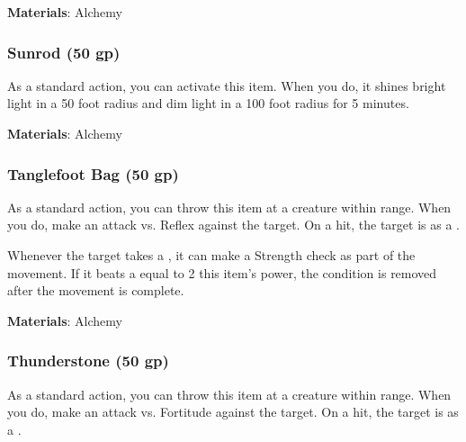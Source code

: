 \vspace{0.25em}
\textbf{Materials}: Alchemy


\lowercase{\hypertarget{item:Sunrod}{}}\label{item:Sunrod}
\hypertarget{item:Sunrod}{\subsubsection{Sunrod\hfill{} (50 gp)}}

As a standard action, you can activate this item.
When you do, it shines bright light in a 50 foot radius and dim light in a 100 foot radius for 5 minutes.



\vspace{0.25em}
\textbf{Materials}: Alchemy


\lowercase{\hypertarget{item:Tanglefoot Bag}{}}\label{item:Tanglefoot Bag}
\hypertarget{item:Tanglefoot Bag}{\subsubsection{Tanglefoot Bag\hfill{} (50 gp)}}

As a standard action, you can throw this item at a creature within \rngclose range.
When you do, make an attack vs. Reflex against the target.
On a hit, the target is  as a .

Whenever the target takes a , it can make a Strength check as part of the movement.
If it beats a  equal to 2 \add this item's power, the condition is removed after the movement is complete.



\vspace{0.25em}
\textbf{Materials}: Alchemy


\lowercase{\hypertarget{item:Thunderstone}{}}\label{item:Thunderstone}
\hypertarget{item:Thunderstone}{\subsubsection{Thunderstone\hfill{} (50 gp)}}

As a standard action, you can throw this item at a creature within \rngclose range.
When you do, make an attack vs. Fortitude against the target.
On a hit, the target is  as a .



